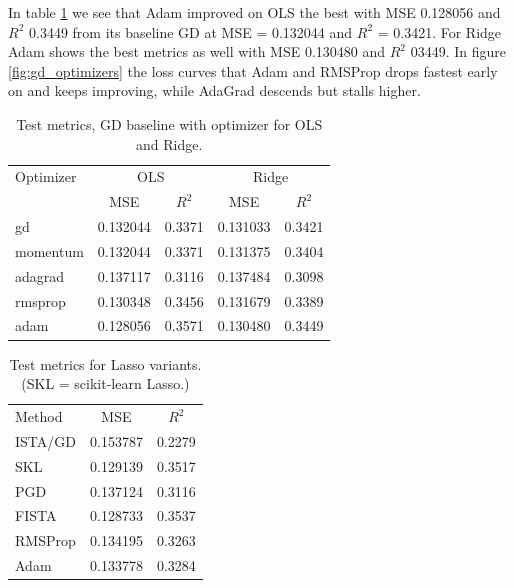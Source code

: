 \documentclass[amssymb,twocolumn,aps]{revtex4-2}
\begin{document}
In table \ref{tab:test-metrics-optimizers} we see that Adam improved on OLS the best with MSE 0.128056 and $R^2$ 0.3449 from its baseline GD at MSE = 0.132044 and $R^2$ = 0.3421. For Ridge Adam shows the best metrics as well with MSE 0.130480 and $R^2$ 03449. In figure \ref{fig:gd_optimizers} the loss curves that Adam and RMSProp drops fastest early on and keeps improving, while AdaGrad descends but stalls higher. 

\begin{table}[h!]
\caption{Test metrics, GD baseline with optimizer for OLS and Ridge.}
\label{tab:test-metrics-optimizers}
\begin{ruledtabular}
\begin{tabular}{lcccc}
Optimizer & \multicolumn{2}{c}{OLS} & \multicolumn{2}{c}{Ridge} \\
\colrule
 & MSE & $R^2$ & MSE & $R^2$ \\
\colrule
gd       & 0.132044 & 0.3371 & 0.131033 & 0.3421 \\
momentum & 0.132044 & 0.3371 & 0.131375 & 0.3404 \\
adagrad  & 0.137117 & 0.3116 & 0.137484 & 0.3098 \\
rmsprop  & 0.130348 & 0.3456 & 0.131679 & 0.3389 \\
adam     & 0.128056 & 0.3571 & 0.130480 & 0.3449 \\
\end{tabular}
\end{ruledtabular}
\end{table}

\begin{table}[h!]
\caption{Test metrics for Lasso variants. (SKL = scikit-learn Lasso.)}
\label{tab:lasso-variants}
\begin{ruledtabular}
\begin{tabular}{lcc}
Method & MSE & $R^2$ \\
\colrule
ISTA/GD    & 0.153787 & 0.2279 \\
SKL     & 0.129139 & 0.3517 \\
PGD     & 0.137124 & 0.3116 \\
FISTA   & 0.128733 & 0.3537 \\
RMSProp & 0.134195 & 0.3263 \\
Adam    & 0.133778 & 0.3284 \\
\end{tabular}
\end{ruledtabular}
\end{table}
\end{document}
